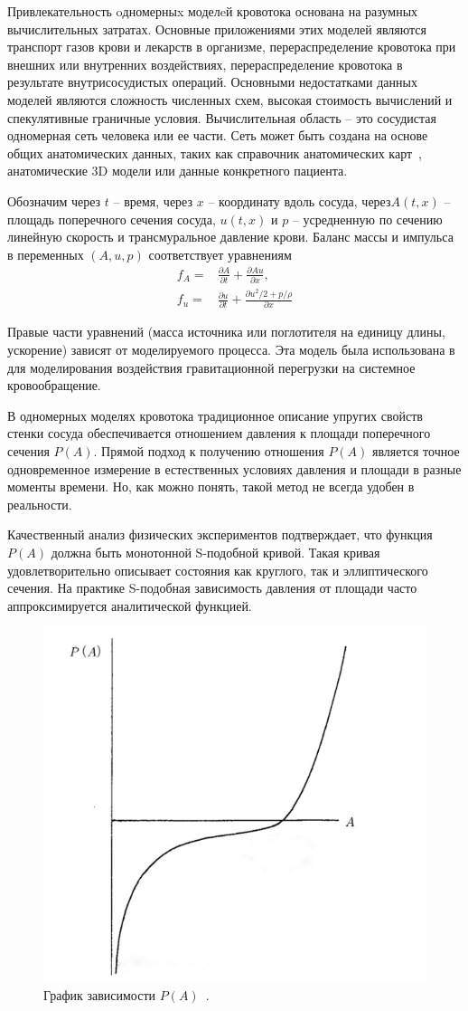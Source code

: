 Привлекательность oдномерныx моделeй кровотока основана на разумных вычислительных затратах. 
Основные приложениями этих моделей являются транспорт газов крови и лекарств в организме, перераспределение кровотока при внешних 
или внутренних воздействиях, перераспределение кровотока в результате внутрисосудистых операций. Основными недостатками данных моделей 
являются сложность численных схем, высокая стоимость вычислений и спекулятивные граничные условия. 
Вычислительная область -- это сосудистая одномерная сеть человека или ее части. 
Сеть может быть создана на основе общих анатомических данных, таких как справочник анатомических карт~\cite{bunicheva:2013}, 
анатомические 3D модели или данные конкретного пациента.


Обозначим через $t$ -- время, через $x$ -- координату вдоль сосуда, через$A(t, x)$ -- площадь поперечного сечения сосуда, 
$u(t, x)$ и $p$ -- усредненную по сечению линейную скорость и трансмуральное давление крови. Баланс массы и импульса в переменных 
$(A, u, p)$ соответствует уравнениям
\begin{align}
    \label{eq:mass-balance}
    f_A=&\frac{\partial A}{\partial t}+\frac{\partial Au}{\partial x},\\
    \label{eq:momentum-balance}
    f_u=&\frac{\partial u}{\partial t}+ \frac{\partial u^2/2+p/\rho}{\partial x}
\end{align}

Правые части уравнений (масса источника или поглотителя на единицу длины, ускорение) зависят от моделируемого процесса. 
Эта модель была использована в~\cite{bunicheva:2004} для моделирования воздействия гравитационной перегрузки на системное кровообращение. 

В одномерных моделях кровотока традиционное описание упругих свойств стенки сосуда обеспечивается отношением давления к площади 
поперечного сечения $P(A)$. Прямой подход к получению отношения $P(A)$ является точное одновременное измерение в естественных 
условиях давления и площади в разные моменты времени. Но, как можно понять, такой метод не всегда удобен в реальности.

Качественный анализ физических экспериментов подтверждает, что функция $P(A)$ должна быть монотонной S-подобной кривой. 
Такая кривая удовлетворительно описывает  состояния как круглого, так и эллиптического сечения. 
На практике S-подобная зависимость давления от площади часто аппроксимируется аналитической функцией. 

\begin{figure}[h]
\centering
\includegraphics[width=0.3\linewidth]{IMG_20230309_021324_943-01.jpeg}
\caption{ График зависимости $P(A)$~\cite{pedly:1998}.}
\label{fig:mpr}
\end{figure}


